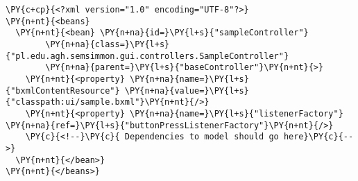 \begin{Verbatim}[commandchars=\\\{\},frame=single,framerule=0.2pt]
\PY{c+cp}{<?xml version="1.0" encoding="UTF-8"?>}
\PY{n+nt}{<beans}
  \PY{n+nt}{<bean} \PY{n+na}{id=}\PY{l+s}{"sampleController"} 
        \PY{n+na}{class=}\PY{l+s}{"pl.edu.agh.semsimmon.gui.controllers.SampleController"}
        \PY{n+na}{parent=}\PY{l+s}{"baseController"}\PY{n+nt}{>}
    \PY{n+nt}{<property} \PY{n+na}{name=}\PY{l+s}{"bxmlContentResource"} \PY{n+na}{value=}\PY{l+s}{"classpath:ui/sample.bxml"}\PY{n+nt}{/>}
    \PY{n+nt}{<property} \PY{n+na}{name=}\PY{l+s}{"listenerFactory"} \PY{n+na}{ref=}\PY{l+s}{"buttonPressListenerFactory"}\PY{n+nt}{/>}
    \PY{c}{<!--}\PY{c}{ Dependencies to model should go here}\PY{c}{-->}
  \PY{n+nt}{</bean>}
\PY{n+nt}{</beans>}
\end{Verbatim}
